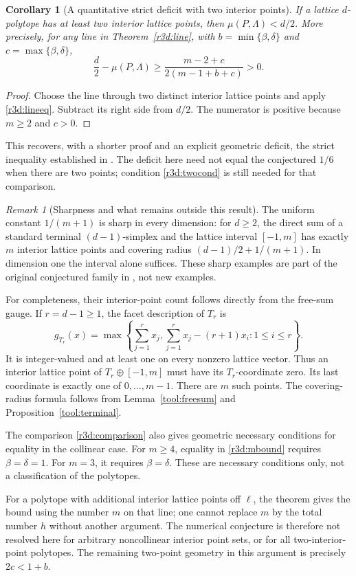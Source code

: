 \documentclass[11pt,a4paper]{article}
\newtheorem{corollary}[theorem]{Corollary}
\theoremstyle{remark}\newtheorem{remark}[theorem]{Remark}
\begin{document}
\begin{corollary}[A quantitative strict deficit with two interior points]
\label{r3d:strict}
If a lattice $d$-polytope has at least two interior lattice points,
then $\mu(P,\Lambda)<d/2$. More precisely, for any line in
Theorem~\ref{r3d:line}, with $b=\min\{\beta,\delta\}$ and
$c=\max\{\beta,\delta\}$,
\[
 \frac d2-\mu(P,\Lambda)
 \ge\frac{m-2+c}{2(m-1+b+c)}>0.
\]
\end{corollary}
\begin{proof}
Choose the line through two distinct interior lattice points and
apply \eqref{r3d:lineeq}. Subtract its right side from $d/2$.
The numerator is positive because $m\ge2$ and $c>0$.
\end{proof}

This recovers, with a shorter proof and an explicit geometric deficit,
the strict inequality established in \cite{TransferTwo}. The deficit
here need not equal the conjectured $1/6$ when there are two points;
condition \eqref{r3d:twocond} is still needed for that comparison.

\begin{remark}[Sharpness and what remains outside this result]
\label{r3d:scope}
The uniform constant $1/(m+1)$ is sharp in every dimension: for $d\ge2$,
the direct sum of a standard terminal $(d-1)$-simplex and the lattice interval
$[-1,m]$ has exactly $m$ interior lattice points and covering radius
$(d-1)/2+1/(m+1)$.  In dimension one the interval alone suffices.
These sharp examples are part of the original
conjectured family in \cite{CSS}, not new examples.

For completeness, their interior-point count follows directly from
the free-sum gauge. If $r=d-1\ge1$, the facet description of $T_r$ is
\[
 g_{T_r}(x)=\max\left\{\sum_{j=1}^r x_j,
       \sum_{j=1}^r x_j-(r+1)x_i:1\le i\le r\right\}.
\]
It is integer-valued and at least one on every nonzero lattice
vector. Thus an interior lattice point of $T_r\oplus[-1,m]$ must
have its $T_r$-coordinate zero. Its last coordinate is exactly one
of $0,\ldots,m-1$. There are $m$ such points. The covering-radius
formula follows from Lemma~\ref{tool:freesum} and
Proposition~\ref{tool:terminal}.

The comparison \eqref{r3d:comparison} also gives geometric necessary
conditions for equality in the collinear case.  For $m\ge4$, equality
in \eqref{r3d:mbound} requires $\beta=\delta=1$.  For $m=3$, it
requires $\beta=\delta$.  These are necessary conditions only, not a
classification of the polytopes.

For a polytope with additional interior lattice points off $\ell$,
the theorem gives the bound using the number $m$ on that line;
one cannot replace $m$ by the total number $h$ without another
argument.  The numerical conjecture is therefore not resolved here
for arbitrary noncollinear interior point sets, or for all
two-interior-point polytopes.  The remaining two-point geometry in
this argument is precisely $2c<1+b$.
\end{remark}
\end{document}
